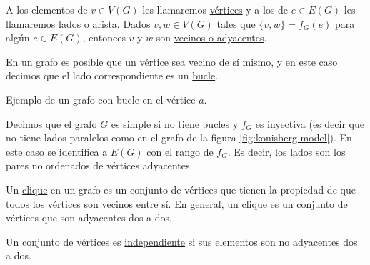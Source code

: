 \begin{defn}[Vocabulario]
    A los elementos de $v \in V(G)$ les llamaremos \ul{vértices} y a los de $e \in E(G)$ les llamaremos \ul{lados o arista}. Dados $v, w \in V(G)$ tales que $\{v, w\} = f_G(e)$ para algún $e \in E(G)$, entonces $v$ y $w$ son \ul{vecinos o adyacentes}.
    
    En un grafo es posible que un vértice sea vecino de sí mismo, y en este caso decimos que el lado correspondiente es un \ul{bucle}.
    
    \begin{marginfigure}
        \centering
        \caption{Ejemplo de un grafo con bucle en el vértice $a$.}
    \end{marginfigure}
    
    Decimos que el grafo $G$ es \ul{simple} si no tiene bucles y $f_G$ es inyectiva (es decir que no tiene lados paralelos como en el grafo de la figura \ref{fig:konisberg-model}). En este caso se identifica a $E(G)$ con el rango de $f_G$. Es decir, los lados son los pares no ordenados de vértices adyacentes.
\end{defn}

\begin{defn}
    Un \ul{clique} en un grafo es un conjunto de vértices que tienen la propiedad de que todos los vértices son vecinos entre sí. En general, un clique es un conjunto de vértices que son adyacentes dos a dos.
    
    Un conjunto de vértices es \ul{independiente} si sus elementos son no adyacentes dos a dos.
\end{defn}

